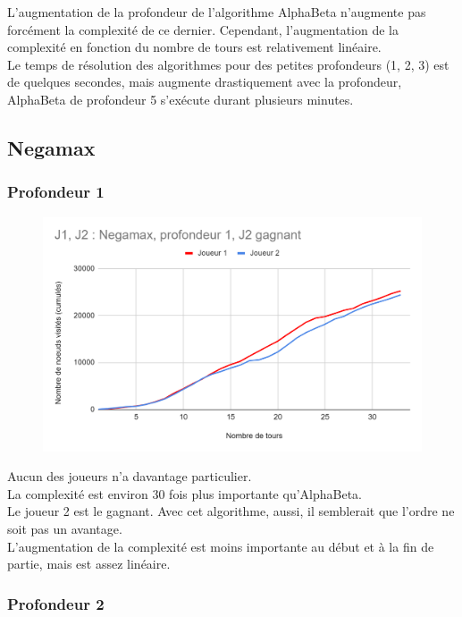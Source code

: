 \documentclass[12pt]{article}
\begin{document}
L’augmentation de la profondeur de l’algorithme AlphaBeta n’augmente pas forcément la complexité de ce dernier. Cependant, l’augmentation de la complexité en fonction du nombre de tours est relativement linéaire.\\
Le temps de résolution des algorithmes pour des petites profondeurs (1, 2, 3) est de quelques secondes, mais augmente drastiquement avec la profondeur, AlphaBeta de profondeur 5 s’exécute durant plusieurs minutes. 

\newpage
\subsection{Negamax}

\subsubsection{Profondeur 1}

\begin{figure}[!h]
   \includegraphics[width=\textwidth]{prof1negamax.png}
\end{figure}

Aucun des joueurs n’a davantage particulier.\\
La complexité est environ 30 fois plus importante qu’AlphaBeta.\\
Le joueur 2 est le gagnant. Avec cet algorithme, aussi, il semblerait que l'ordre ne soit pas un avantage.\\
L’augmentation de la complexité est moins importante au début et à la fin de partie, mais est assez linéaire.

\newpage
\subsubsection{Profondeur 2}
\end{document}
